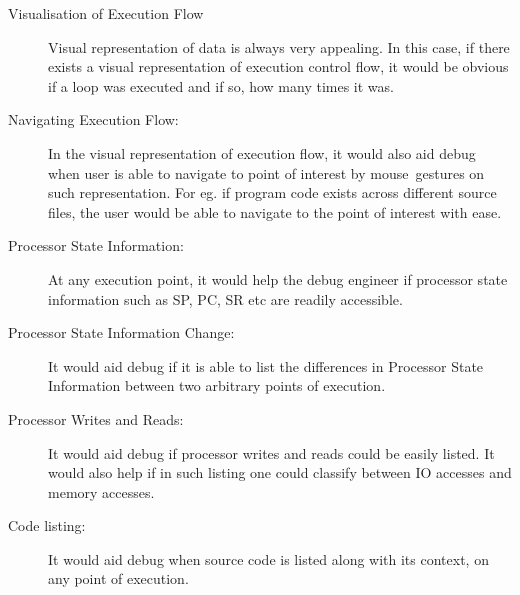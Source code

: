 \begin{description}
\item[Visualisation of Execution Flow] Visual representation of data is always very appealing. In this case, if there exists a visual representation of execution control flow, it would be obvious if a loop was executed and if so, how many times it was.
\item[Navigating Execution Flow:] In the visual representation of execution flow, it would also aid debug when user is able to navigate to point of interest by mouse~gestures on such representation. For eg. if program code exists across different source files, the user would be able to navigate to the point of interest with ease.
\item[Processor State Information:] At any execution point, it would help the debug engineer if processor state information such as SP, PC, SR etc are readily accessible.
\item[Processor State Information Change:] It would aid debug if it is able to list the differences in Processor State Information between two arbitrary points of execution.
\item[Processor Writes and Reads:] It would aid debug if processor writes and reads could be easily listed. It would also help if in such listing one could classify between IO accesses and memory accesses.
\item[Code listing:] It would aid debug when source code is listed along with its context, on any point of execution.
\end{description}

